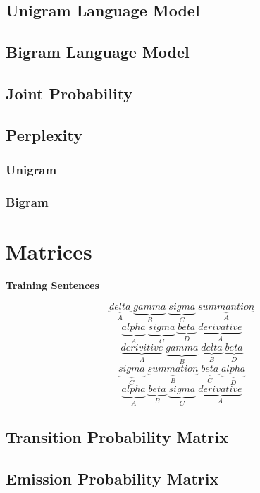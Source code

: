 \documentclass{article}
\begin{document}
\subsection{Unigram Language Model}
\subsection{Bigram Language Model}
\subsection{Joint Probability} 
\subsection{Perplexity}
\subsubsection{Unigram}
\subsubsection{Bigram}
\section{Matrices}
\begin{center}
	\textbf{Training Sentences}
\end{center}
\begin{equation}
	\underbrace{delta}_{A}\;\underbrace{gamma}_{B}\; \underbrace{sigma}_{C}\; \underbrace{summantion}_{A}\;
\end{equation}
\begin{equation}
	\underbrace{alpha}_{A}\;\underbrace{sigma}_{C}\; \underbrace{beta}_{D}\; \underbrace{derivative}_{A}\;
\end{equation}
\begin{equation}
	\underbrace{derivitive}_{A}\;\underbrace{gamma}_{B}\; \underbrace{delta}_{B}\; \underbrace{beta}_{D}\;
\end{equation}
\begin{equation}
	\underbrace{sigma}_{C}\;\underbrace{summation}_{B}\; \underbrace{beta}_{C}\; \underbrace{alpha}_{D}\;
\end{equation}
\begin{equation}
	\underbrace{alpha}_{A}\;\underbrace{beta}_{B}\; \underbrace{sigma}_{C}\; \underbrace{derivative}_{A}\;
\end{equation}
\subsection{Transition Probability Matrix}
\subsection{Emission Probability Matrix}
\end{document}
